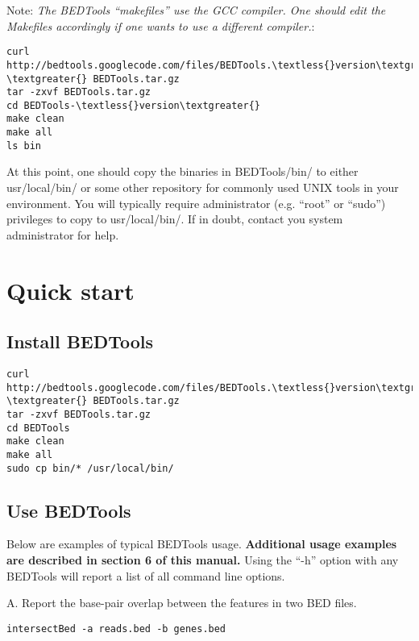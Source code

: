 \documentclass[letterpaper,10pt,english]{sphinxmanual}
\begin{document}
Note: \emph{The BEDTools ``makefiles'' use the GCC compiler. One should edit the Makefiles accordingly if
one wants to use a different compiler.}:

\begin{Verbatim}[commandchars=\\\{\}]
curl http://bedtools.googlecode.com/files/BEDTools.\textless{}version\textgreater{}.tar.gz \textgreater{} BEDTools.tar.gz
tar -zxvf BEDTools.tar.gz
cd BEDTools-\textless{}version\textgreater{}
make clean
make all
ls bin
\end{Verbatim}

At this point, one should copy the binaries in BEDTools/bin/ to either usr/local/bin/ or some
other repository for commonly used UNIX tools in your environment. You will typically require
administrator (e.g. ``root'' or ``sudo'') privileges to copy to usr/local/bin/. If in doubt, contact you
system administrator for help.


\section{Quick start}
\label{content/quick-start:quick-start}\label{content/quick-start::doc}

\subsection{Install BEDTools}
\label{content/quick-start:install-bedtools}
\begin{Verbatim}[commandchars=\\\{\}]
curl http://bedtools.googlecode.com/files/BEDTools.\textless{}version\textgreater{}.tar.gz \textgreater{} BEDTools.tar.gz
tar -zxvf BEDTools.tar.gz
cd BEDTools
make clean
make all
sudo cp bin/* /usr/local/bin/
\end{Verbatim}


\subsection{Use BEDTools}
\label{content/quick-start:use-bedtools}
Below are examples of typical BEDTools usage. \textbf{Additional usage examples are described in
section 6 of this manual.} Using the ``-h'' option with any BEDTools will report a list of all command
line options.

A. Report the base-pair overlap between the features in two BED files.

\begin{Verbatim}[commandchars=\\\{\}]
intersectBed -a reads.bed -b genes.bed
\end{Verbatim}
\end{document}
